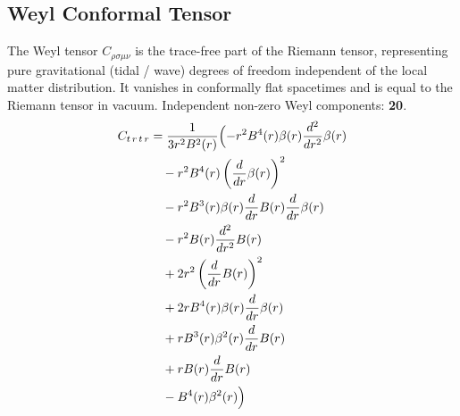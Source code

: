 \documentclass[11pt,a4paper]{article}
\begin{document}
\subsection{Weyl Conformal Tensor}
The Weyl tensor $C_{\rho\sigma\mu\nu}$ is the trace-free part of the Riemann tensor, representing pure gravitational (tidal / wave) degrees of freedom independent of the local matter distribution. It vanishes in conformally flat spacetimes and is equal to the Riemann tensor in vacuum.
Independent non-zero Weyl components: \textbf{20}.
\begin{align*}
  C_{t\,r\,t\,r} &= \frac{1}{3 r^{2} B^{2}{\left(r \right)}}\Bigl(- r^{2} B^{4}{\left(r \right)} \beta{\left(r \right)} \frac{d^{2}}{d r^{2}} \beta{\left(r \right)} \\
  &\quad - r^{2} B^{4}{\left(r \right)} \left(\frac{d}{d r} \beta{\left(r \right)}\right)^{2} \\
  &\quad - r^{2} B^{3}{\left(r \right)} \beta{\left(r \right)} \frac{d}{d r} B{\left(r \right)} \frac{d}{d r} \beta{\left(r \right)} \\
  &\quad - r^{2} B{\left(r \right)} \frac{d^{2}}{d r^{2}} B{\left(r \right)} \\
  &\quad + 2 r^{2} \left(\frac{d}{d r} B{\left(r \right)}\right)^{2} \\
  &\quad + 2 r B^{4}{\left(r \right)} \beta{\left(r \right)} \frac{d}{d r} \beta{\left(r \right)} \\
  &\quad + r B^{3}{\left(r \right)} \beta^{2}{\left(r \right)} \frac{d}{d r} B{\left(r \right)} \\
  &\quad + r B{\left(r \right)} \frac{d}{d r} B{\left(r \right)} \\
  &\quad - B^{4}{\left(r \right)} \beta^{2}{\left(r \right)}\Bigr)
\end{align*}
\end{document}
